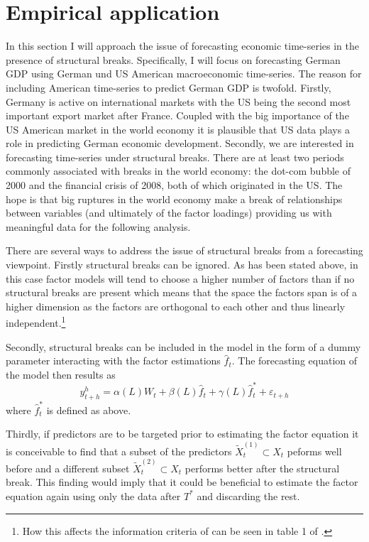 \documentclass[12pt]{article}
\begin{document}
\section{Empirical application}
In this section I will approach the issue of forecasting economic time-series in the presence of structural breaks. Specifically, I will focus on forecasting German GDP using German und US American macroeconomic time-series. The reason for including American time-series to predict German GDP is twofold. Firstly, Germany is active on international markets with the US being the second most important export market after France. Coupled with the big importance of the US American market in the world economy it is plausible that US data plays a role in predicting German economic development. Secondly, we are interested in forecasting time-series under structural breaks. There are at least two periods commonly associated with breaks in the world economy: the dot-com bubble of 2000 and the financial crisis of 2008, both of which originated in the US. The hope is that big ruptures in the world economy make a break of relationships between variables (and ultimately of the factor loadings) providing us with meaningful data for the following analysis.

There are several ways to address the issue of structural breaks from a forecasting viewpoint. Firstly structural breaks can be ignored. As has been stated above, in this case factor models will tend to choose a higher number of factors than if no structural breaks are present which means that the space the factors span is of a higher dimension as the factors are orthogonal to each other and thus linearly independent.\footnote{How this affects the information criteria of \citet{bai2002determining} can be seen in table 1 of \citet{breitung2011testing}.}

Secondly, structural breaks can be included in the model in the form of a dummy parameter interacting with the factor estimations $\hat f_t$. The forecasting equation of the model then results as
\begin{equation}
	\label{forecasting, structural breaks}
	y^h_{t+h} = \alpha(L) W_t + \beta(L) \hat f_t + \gamma(L) \hat f_t^* + \varepsilon_{t+h}
\end{equation}
where $\hat f_t^*$ is defined as above.

Thirdly, if predictors are to be targeted prior to estimating the factor equation it is conceivable to find that a subset of the predictors $\tilde X_t^{(1)} \subset X_t$ peforms well before and a different subset $\tilde X_t^{(2)} \subset X_t$ performs better after the structural break. This finding would imply that it could be beneficial to estimate the factor equation again using only the data after $T^*$ and discarding the rest.
\end{document}
